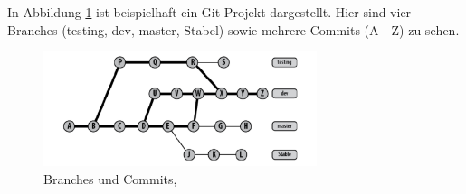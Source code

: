 In Abbildung \ref{fig:Git} ist beispielhaft ein Git-Projekt dargestellt. Hier sind vier Branches (testing, dev, master, Stabel) sowie mehrere Commits (A - Z) zu sehen.

\begin{figure}[h]
	\centering
	\includegraphics[width=8cm]{pics/Git.png}
	\caption{Branches und Commits, \cite{Loeliger:2012}}
	\label{fig:Git}
\end{figure}  